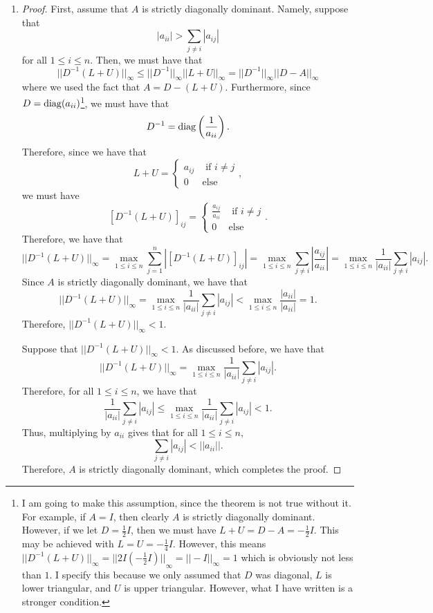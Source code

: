 \documentclass[12pt]{article}
\begin{document}
\begin{enumerate}[leftmargin=0em]
    \item 
    \begin{proof}
        First, assume that $A$ is strictly diagonally dominant. Namely, suppose that
        \[|a_{ii}| > \sum_{j\neq i}|a_{ij}|\]
        for all $1\leq i \leq n$. Then, we must have that
        \[{||D^{-1}(L+U)||}_{\infty} \leq {||D^{-1}||}_{\infty} {||L+U||}_{\infty} =  {||D^{-1}||}_{\infty}{||D-A||}_{\infty}\]
        where we used the fact that $A=D-(L+U)$. Furthermore, since $D=\operatorname{diag}(a_{ii})$\footnote{I am going to make this assumption, since the theorem is not true without it. For example, if $A=I$, then clearly $A$ is strictly diagonally dominant. However, if we let $D=\frac{1}{2}I$, then we must have $L+U= D-A=-\frac{1}{2}I$. This may be achieved with $L=U=-\frac{1}{4}I$. However, this means ${||D^{-1}(L+U)||}_{\infty}= {||2I\left(-\frac{1}{2}I\right)||}_{\infty} = {||-I||}_{\infty} = 1$ which is obviously not less than $1$. I specify this because we only assumed that $D$ was diagonal, $L$ is lower triangular, and $U$ is upper triangular. However, what I have written is a stronger condition.}, we must have that
        \[D^{-1} = \operatorname{diag}\left(\frac{1}{a_{ii}}\right).\]
        Therefore, since we have that
        \[L+U =
        \begin{cases}
            a_{ij} & \text{ if } i\neq j\\
            0 & \text{else}    
        \end{cases},\]
        we must have
        \[{[D^{-1}(L+U)]}_{ij} = 
        \begin{cases}
            \frac{a_{ij}}{a_{ii}} & \text{ if  } i\neq j\\
            0 & \text{else}
        \end{cases}.\]
        Therefore, we have that
        \[{||D^{-1}(L+U)||}_{\infty} = \max_{1\leq i \leq n}\sum_{j=1}^{n}\left|{[D^{-1}(L+U)]}_{ij}\right| = \max_{1\leq i \leq n}\sum_{j\neq i} \left|\frac{a_{ij}}{a_{ii}}\right|= \max_{1\leq i\leq n}\frac{1}{|a_{ii}|}\sum_{j\neq i}|a_{ij}|.\]
        Since $A$ is strictly diagonally dominant, we have that
        \[{||D^{-1}(L+U)||}_{\infty}= \max_{1\leq i\leq n}\frac{1}{|a_{ii}|}\sum_{j\neq i}|a_{ij}| < \max_{1\leq i \leq n}\frac{|a_{ii}|}{|a_{ii}|} = 1.\]
        Therefore, ${||D^{-1}(L+U)||}_{\infty}<1$.

        \bigskip 

        \noindent Suppose that ${||D^{-1}(L+U)||}_{\infty}<1$. As discussed before, we have that
        \[{||D^{-1}(L+U)||}_{\infty}= \max_{1\leq i\leq n}\frac{1}{|a_{ii}|}\sum_{j\neq i}|a_{ij}|.\]
        Therefore, for all $1\leq i \leq n$, we have that
        \[\frac{1}{|a_{ii}|}\sum_{j\neq i}|a_{ij}|\leq \max_{1\leq i\leq n}\frac{1}{|a_{ii}|}\sum_{j\neq i}|a_{ij}|<1.\]
        Thus, multiplying by $a_{ii}$ gives that for all $1\leq i\leq n$,
        \[\sum_{j\neq i}|a_{ij}|<||a_{ii}||.\]
        Therefore, $A$ is strictly diagonally dominant, which completes the proof.
    \end{proof}
\end{enumerate}
\end{document}
